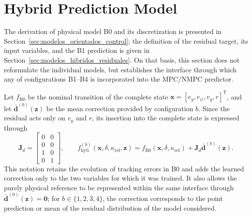 \documentclass[12pt,a4paper]{report}
\begin{document}
\section{Hybrid Prediction Model}
\label{sec:arquitectura_modelo_hibrido}

The derivation of physical model B0 and its discretization is presented in Section~\ref{sec:modelos_orientados_control}; the definition of the residual target, its input variables, and the B1 prediction is given in Section~\ref{sec:modelos_hibridos_residuales}. On that basis, this section does not reformulate the individual models, but establishes the interface through which any of configurations B1--B4 is incorporated into the MPC/NMPC predictor.

Let $f_{\mathrm{B0}}$ be the nominal transition of the complete state $\mathbf{x}=[e_y,e_\psi,v_y,r]^{\mathsf T}$, and let $\bar{\mathbf d}^{(b)}(\mathbf z)$ be the mean correction provided by configuration $b$. Since the residual acts only on $v_y$ and $r$, its insertion into the complete state is expressed through
\begin{equation}
    \mathbf{J}_d
    =
    \begin{bmatrix}
        0 & 0 \\
        0 & 0 \\
        1 & 0 \\
        0 & 1
    \end{bmatrix},
    \qquad
    f_{\mathrm{hyb}}^{(b)}
    (\mathbf{x},\delta,\kappa_{\mathrm{ref}},\mathbf z)
    =
    f_{\mathrm{B0}}
    (\mathbf{x},\delta,\kappa_{\mathrm{ref}})
    +
    \mathbf{J}_d\bar{\mathbf d}^{(b)}(\mathbf z).
    \label{eq:full_state_hybrid_transition}
\end{equation}
This notation retains the evolution of tracking errors in B0 and adds the learned correction only to the two variables for which it was trained. It also allows the purely physical reference to be represented within the same interface through $\bar{\mathbf d}^{(0)}(\mathbf z)=\mathbf 0$; for $b\in\{1,2,3,4\}$, the correction corresponds to the point prediction or mean of the residual distribution of the model considered.
\end{document}
